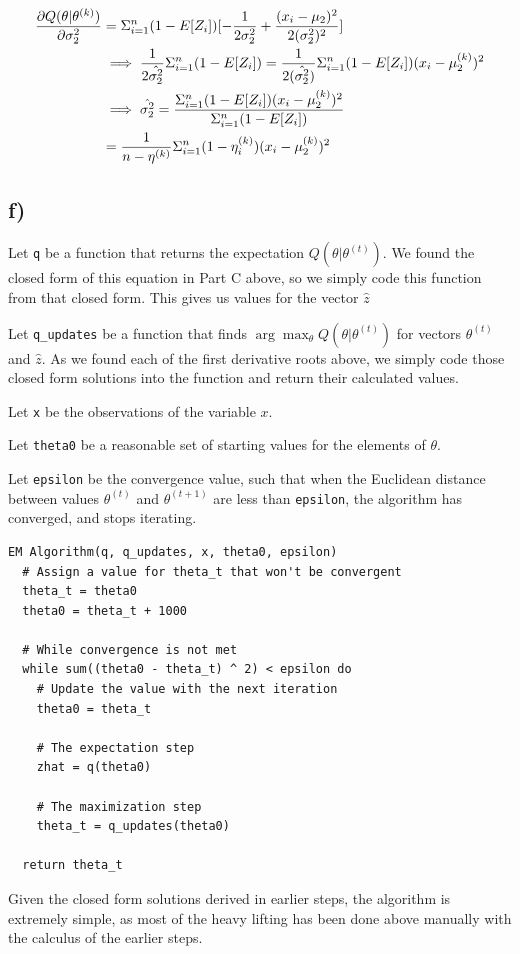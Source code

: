 \documentclass[]{article}
\begin{document}
\begin{align*}
\frac{\partial Q(\theta | \theta^{(k)})}{\partial \sigma_2^{2}} &= \Sigma_{i=1}^{n}(1 - E[Z_i])[-\frac{1}{2 \sigma_2^2} + \frac{(x_i -\mu_2)^2}{2(\sigma_2^2)^2}] \\
&\implies \frac{1}{2\hat{\sigma_2^2}} \Sigma_{i=1}^{n}(1 - E[Z_i]) = \frac{1}{2(\hat{\sigma_2^2})} \Sigma_{i=1}^{n} (1 - E[Z_i])(x_i - \mu_2^{(k)})^2 \\
&\implies \hat{\sigma_2^2} = \frac{\Sigma_{i=1}^{n} (1 - E[Z_i]) (x_i - \mu_2^{(k)})^2}{\Sigma_{i=1}^{n}(1 - E[Z_i])}  \\
&= \frac{1}{n - \eta^{(k)}} \Sigma_{i=1}^{n} (1 - \eta^{(k)}_i)(x_i - \mu_2^{(k)})^2
\end{align*}

\subsection{f)}\label{f}

Let \texttt{q} be a function that returns the expectation
\(Q(\theta | \theta^{(t)})\). We found the closed form of this equation
in Part C above, so we simply code this function from that closed form.
This gives us values for the vector \(\hat{z}\)

Let \texttt{q\_updates} be a function that finds
\(\arg \max_\theta Q(\theta | \theta^{(t)})\) for vectors
\(\theta^{(t)}\) and \(\hat{z}\). As we found each of the first
derivative roots above, we simply code those closed form solutions into
the function and return their calculated values.

Let \texttt{x} be the observations of the variable \(x\).

Let \texttt{theta0} be a reasonable set of starting values for the
elements of \(\theta\).

Let \texttt{epsilon} be the convergence value, such that when the
Euclidean distance between values \(\theta^{(t)}\) and
\(\theta^{(t + 1)}\) are less than \texttt{epsilon}, the algorithm has
converged, and stops iterating.

\begin{verbatim}
EM Algorithm(q, q_updates, x, theta0, epsilon)
  # Assign a value for theta_t that won't be convergent
  theta_t = theta0
  theta0 = theta_t + 1000
  
  # While convergence is not met
  while sum((theta0 - theta_t) ^ 2) < epsilon do 
    # Update the value with the next iteration
    theta0 = theta_t
    
    # The expectation step
    zhat = q(theta0)
    
    # The maximization step
    theta_t = q_updates(theta0)

  return theta_t
\end{verbatim}

Given the closed form solutions derived in earlier steps, the algorithm
is extremely simple, as most of the heavy lifting has been done above
manually with the calculus of the earlier steps.
\end{document}
